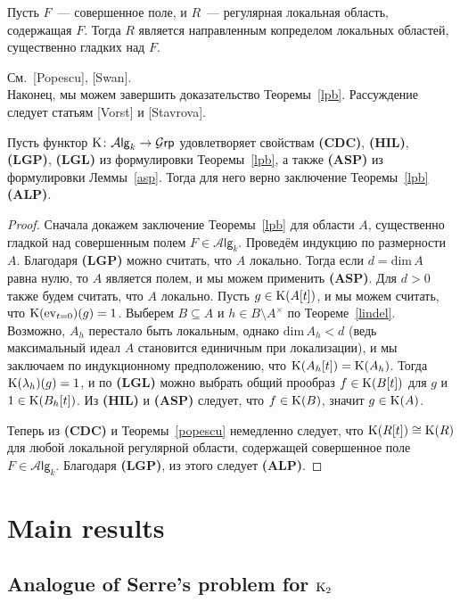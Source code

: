 \documentclass[oneside, 11pt]{amsart} \pdfoutput=1
\begin{document}
\begin{theorem}[Popescu]
\label{popescu}
Пусть $F$~--- совершенное поле, и $R$~--- регулярная локальная область, содержащая $F$. Тогда $R$ является направленным копределом локальных областей, существенно гладких над $F$.
\end{theorem}
См.~[Popescu], [Swan].\\

Наконец, мы можем завершить доказательство Теоремы~\ref{lpb}. Рассуждение следует статьям [Vorst] и [Stavrova].

\begin{lemma}
Пусть функтор ${\mathrm{K}}\colon\mathcal A\mathsf{lg}_k\rightarrow\mathcal G\mathsf{rp}$ удовлетворяет свойствам {\bf(CDC)}, {\bf(HIL)}, {\bf(LGP)}, {\bf(LGL)} из формулировки Теоремы~\ref{lpb}, а также {\bf(ASP)} из формулировки Леммы~\ref{asp}. Тогда для него верно заключение Теоремы~\ref{lpb} {\bf(ALP)}. 
\end{lemma}
\begin{proof}
Сначала докажем заключение Теоремы~\ref{lpb} для области $A$, существенно гладкой над совершенным полем $F\in\mathcal A\mathsf{lg}_k$. Проведём индукцию по размерности $A$. Благодаря {\bf(LGP)} можно считать, что $A$ локально. Тогда если $d=\mathrm{dim}\,A$ равна нулю, то $A$ является полем, и мы можем применить {\bf(ASP)}. Для $d>0$ также будем считать, что $A$ локально. Пусть $g\in{\mathrm{K}}(A[t])$, и мы можем считать, что ${\mathrm{K}}(\mathrm{ev}_{t=0})(g)=1$. Выберем $B\subseteq A$ и $h\in B\setminus A^\times$ по Теореме~\ref{lindel}. Возможно, $A_h$ перестало быть локальным, однако $\mathrm{dim}\,A_h<d$ (ведь максимальный идеал $A$ становится единичным при локализации), и мы заключаем по индукционному предположению, что ${\mathrm{K}}(A_h[t])={\mathrm{K}}(A_h)$. Тогда ${\mathrm{K}}(\lambda_h)(g)=1$, и по {\bf(LGL)} можно выбрать общий прообраз $f\in{\mathrm{K}}(B[t])$ для $g$ и $1\in{\mathrm{K}}(B_h[t])$. Из {\bf(HIL)} и {\bf(ASP)} следует, что $f\in{\mathrm{K}}(B)$, значит $g\in{\mathrm{K}}(A)$.

Теперь из {\bf(CDC)} и Теоремы~\ref{popescu} немедленно следует, что ${\mathrm{K}}(R[t])\cong{\mathrm{K}}(R)$ для любой локальной регулярной области, содержащей совершенное поле $F\in\mathcal A\mathsf{lg}_k$. Благодаря {\bf(LGP)}, из этого следует {\bf(ALP)}.
\end{proof}

\section{Main results}
\subsection{Analogue of Serre's problem for \texorpdfstring{${\mathrm{K}}_2$}{K2}}
\end{document}
